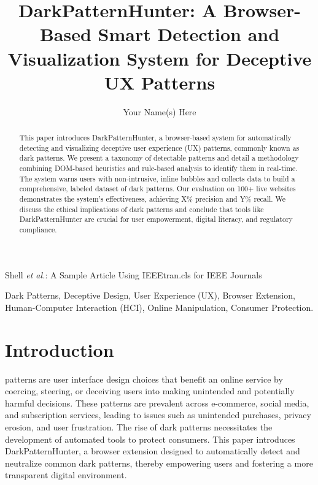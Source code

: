 \documentclass[journal]{IEEEtran}
\begin{document}
\title{DarkPatternHunter: A Browser-Based Smart Detection and Visualization System for Deceptive UX Patterns}

\author{Your Name(s) Here}

%
{Shell \MakeLowercase{\textit{et al.}}: A Sample Article Using IEEEtran.cls for IEEE Journals}


\maketitle

\begin{abstract}
This paper introduces DarkPatternHunter, a browser-based system for automatically detecting and visualizing deceptive user experience (UX) patterns, commonly known as dark patterns. We present a taxonomy of detectable patterns and detail a methodology combining DOM-based heuristics and rule-based analysis to identify them in real-time. The system warns users with non-intrusive, inline bubbles and collects data to build a comprehensive, labeled dataset of dark patterns. Our evaluation on 100+ live websites demonstrates the system's effectiveness, achieving X\% precision and Y\% recall. We discuss the ethical implications of dark patterns and conclude that tools like DarkPatternHunter are crucial for user empowerment, digital literacy, and regulatory compliance.
\end{abstract}

\begin{IEEEkeywords}
Dark Patterns, Deceptive Design, User Experience (UX), Browser Extension, Human-Computer Interaction (HCI), Online Manipulation, Consumer Protection.
\end{IEEEkeywords}

\section{Introduction}
 patterns are user interface design choices that benefit an online service by coercing, steering, or deceiving users into making unintended and potentially harmful decisions. These patterns are prevalent across e-commerce, social media, and subscription services, leading to issues such as unintended purchases, privacy erosion, and user frustration. The rise of dark patterns necessitates the development of automated tools to protect consumers. This paper introduces DarkPatternHunter, a browser extension designed to automatically detect and neutralize common dark patterns, thereby empowering users and fostering a more transparent digital environment.
\end{document}
